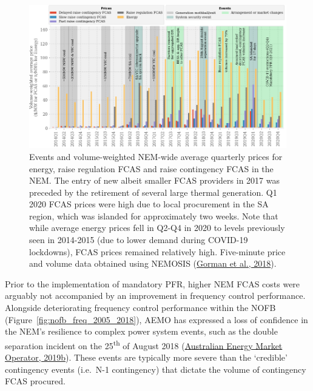 \documentclass[12pt,a4paper,]{report}
\begin{document}
\begin{figure}
\hypertarget{fig:raise_fcas_vwap}{%
\centering
\includegraphics{source/figures/energy_raise_fcas_vwap_quarterly_2014_2020_v2.png}
\caption[Volume-weighted NEM-wide average quarterly prices for energy
and FCAS, 2014-2020]{Events and volume-weighted NEM-wide average
quarterly prices for energy, raise regulation FCAS and raise contingency
FCAS in the NEM. The entry of new albeit smaller FCAS providers in 2017
was preceded by the retirement of several large thermal generation. Q1
2020 FCAS prices were high due to local procurement in the SA region,
which was islanded for approximately two weeks. Note that while average
energy prices fell in Q2-Q4 in 2020 to levels previously seen in
2014-2015 (due to lower demand during COVID-19 lockdowns), FCAS prices
remained relatively high. Five-minute price and volume data obtained
using NEMOSIS (\protect\hyperlink{ref-gormanNEMOSISNEMOpen2018}{Gorman
et al., 2018}).}\label{fig:raise_fcas_vwap}
}
\end{figure}

Prior to the implementation of mandatory PFR, higher NEM FCAS costs were
arguably not accompanied by an improvement in frequency control
performance. Alongside deteriorating frequency control performance
within the NOFB (Figure~\ref{fig:nofb_freq_2005_2018}), AEMO has
expressed a loss of confidence in the NEM's resilience to complex power
system events, such as the double separation incident on the
25\textsuperscript{th} of August 2018
(\protect\hyperlink{ref-australianenergymarketoperatorElectricityRuleChange2019}{Australian
Energy Market Operator, 2019b}). These events are typically more severe
than the `credible' contingency events (i.e.~N-1 contingency) that
dictate the volume of contingency FCAS procured.
\end{document}
